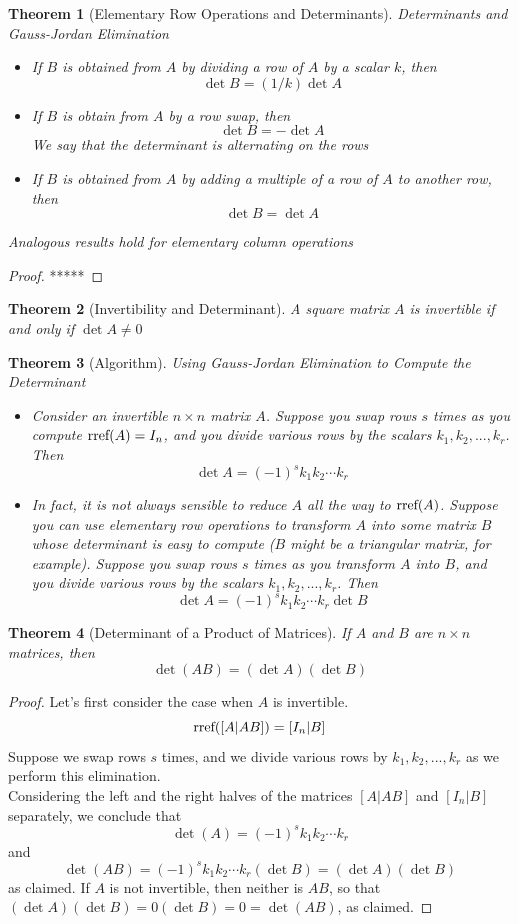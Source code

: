 \documentclass[10pt]{report}
\newtheorem{thm2}{Theorem}[section]
\newcommand{\rref}{\textup{rref}}
\begin{document}
\begin{thm2}[Elementary Row Operations and Determinants]
Determinants and Gauss-Jordan Elimination
\begin{itemize}
\item[a.] If $B$ is obtained from $A$ by dividing a row of $A$ by a scalar $k$, then
$$\det B = (1/k)\det A$$
\item[b.] If $B$ is obtain from $A$ by a row swap, then
$$\det B = -\det A$$
We say that the determinant is alternating on the rows
\item[c.] If $B$ is obtained from $A$ by adding a multiple of a row of $A$ to another row, then
$$\det B = \det A$$
\end{itemize}
Analogous results hold for elementary column operations
\end{thm2}
\begin{proof}
*****
\end{proof}
\begin{thm2}[Invertibility and Determinant]
A square matrix $A$ is invertible if and only if $\det A\neq 0$
\end{thm2}
\begin{thm2}[Algorithm] Using Gauss-Jordan Elimination to Compute the Determinant
\begin{itemize}
\item[a.] Consider an invertible $n\times n$ matrix $A$. Suppose you swap rows $s$ times as you compute $\rref(A)=I_n$, and you divide various rows by the scalars $k_1,k_2,...,k_r$. Then
$$\det A = (-1)^sk_1k_2\cdots k_r$$
\item[b.] In fact, it is not always sensible to reduce $A$ all the way to $\rref(A)$. Suppose you can use elementary row operations to transform $A$ into some matrix $B$ whose determinant is easy to compute ($B$ might be a triangular matrix, for example). Suppose you swap rows $s$ times as you transform $A$ into $B$, and you divide various rows by the scalars $k_1,k_2,...,k_r$. Then
$$\det A = (-1)^sk_1k_2\cdots k_r\det B$$
\end{itemize}
\end{thm2}
\begin{thm2}[Determinant of a Product of Matrices]
If $A$ and $B$ are $n\times n$ matrices, then
$$\det (AB) = (\det A)(\det B)$$
\end{thm2}
\begin{proof}
Let's first consider the case when $A$ is invertible.
$$\rref([A|AB])=[I_n|B]$$
Suppose we swap rows $s$ times, and we divide various rows by $k_1, k_2, ..., k_r$ as we perform this elimination.\\
Considering the left and the right halves of the matrices $[A|AB]$ and $[I_n|B]$ separately, we conclude that
$$\det(A) = (-1)^sk_1k_2\cdots k_r$$
and
$$\det(AB)=(-1)^sk_1k_2\cdots k_r(\det B)=(\det A)(\det B)$$
as claimed. If $A$ is not invertible, then neither is $AB$, so that $(\det A)(\det B) = 0(\det B) = 0 = \det (AB)$, as claimed.
\end{proof}
\end{document}
